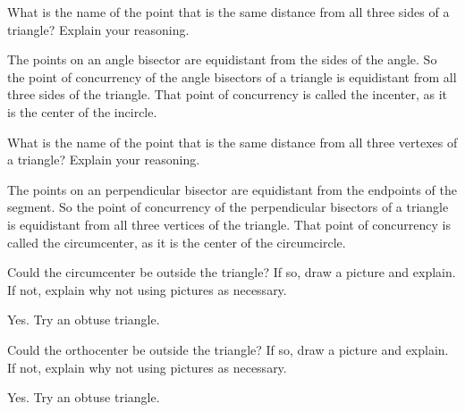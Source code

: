 \documentclass[nooutcomes]{ximera}
\begin{document}
\begin{problem}
What is the name of the point that is the same distance from all
  three sides of a triangle? Explain your reasoning.
\begin{freeResponse}
\begin{hint}
The points on an angle bisector are equidistant from the sides of the angle.  So the point of concurrency of the angle bisectors of a triangle is equidistant from all three sides of the triangle.  That point of concurrency is called the incenter, as it is the center of the incircle.  
\end{hint}
\end{freeResponse}
\end{problem}

\begin{problem}
What is the name of the point that is the same distance from all
  three vertexes of a triangle? Explain your reasoning.
\begin{freeResponse}
\begin{hint}
The points on an perpendicular bisector are equidistant from the endpoints of the segment.  So the point of concurrency of the perpendicular bisectors of a triangle is equidistant from all three vertices of the triangle.  That point of concurrency is called the circumcenter, as it is the center of the circumcircle.  
\end{hint}
\end{freeResponse}
\end{problem}

\begin{problem}
Could the circumcenter be outside the triangle? If so, draw a
  picture and explain. If not, explain why not using pictures as
  necessary.
\begin{freeResponse}
\begin{hint}
Yes.  Try an obtuse triangle. 
\end{hint}
\end{freeResponse}
\end{problem}

\begin{problem}
Could the orthocenter be outside the triangle? If so, draw a
  picture and explain. If not, explain why not using pictures as
  necessary.
\begin{freeResponse}
\begin{hint}
Yes.  Try an obtuse triangle. 
\end{hint}
\end{freeResponse}
\end{problem}
\end{document}
